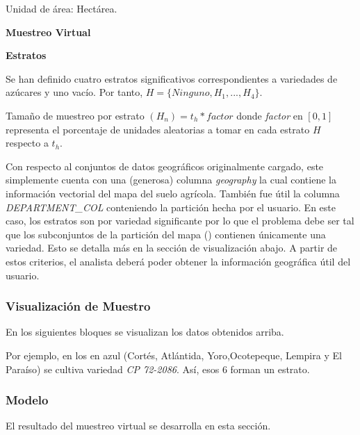 \bigbreak

Unidad de área: Hectárea.

\bigbreak

\textbf{Muestreo Virtual}

\bigbreak

\textbf{Estratos}

\bigbreak

Se han definido cuatro estratos significativos correspondientes a variedades de azúcares y uno vacío. Por tanto, $H = \{ Ninguno, H_1, ... , H_4 \}$.

\bigbreak

Tamaño de muestreo por estrato $(H_n) = t_h * factor$ donde \textit{factor} en $[0,1]$ representa el porcentaje de unidades aleatorias a tomar en cada estrato $H$ respecto a $t_h$.

\bigbreak

Con respecto al conjuntos de datos geográficos originalmente cargado, este simplemente cuenta con una (generosa) columna \textit{geography} la cual contiene la información vectorial del mapa del suelo agrícola. También fue útil la columna \textit{DEPARTMENT\_COL} conteniendo la partición hecha por el usuario. En este caso, los estratos son por variedad significante por lo que el problema debe ser tal que los subconjuntos de la partición del mapa () contienen únicamente una variedad. Esto se detalla más en la sección de visualización abajo. A partir de estos criterios, el analista deberá poder obtener la información geográfica útil del usuario.

\subsubsection{Visualización de Muestro}

En los siguientes bloques se visualizan los datos obtenidos arriba.

\bigbreak

Por ejemplo, en los  en azul (Cortés, Atlántida, Yoro,Ocotepeque, Lempira y El Paraíso) se cultiva variedad \textit{CP 72-2086}. Así, esos $6$  forman un estrato.

\subsubsection{Modelo}

El resultado del muestreo virtual se desarrolla en esta sección.

\bigbreak

